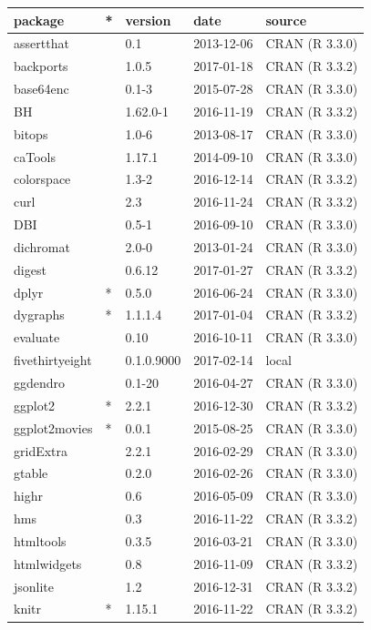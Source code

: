 \documentclass[]{tufte-book}
\theoremstyle{definition}
\theoremstyle{definition}
\theoremstyle{remark}
\begin{document}
\begin{longtable}{lllll}
\toprule
package & * & version & date & source\\
\midrule
assertthat &  & 0.1 & 2013-12-06 & CRAN (R 3.3.0)\\
backports &  & 1.0.5 & 2017-01-18 & CRAN (R 3.3.2)\\
base64enc &  & 0.1-3 & 2015-07-28 & CRAN (R 3.3.0)\\
BH &  & 1.62.0-1 & 2016-11-19 & CRAN (R 3.3.2)\\
bitops &  & 1.0-6 & 2013-08-17 & CRAN (R 3.3.0)\\
\addlinespace
caTools &  & 1.17.1 & 2014-09-10 & CRAN (R 3.3.0)\\
colorspace &  & 1.3-2 & 2016-12-14 & CRAN (R 3.3.2)\\
curl &  & 2.3 & 2016-11-24 & CRAN (R 3.3.2)\\
DBI &  & 0.5-1 & 2016-09-10 & CRAN (R 3.3.0)\\
dichromat &  & 2.0-0 & 2013-01-24 & CRAN (R 3.3.0)\\
\addlinespace
digest &  & 0.6.12 & 2017-01-27 & CRAN (R 3.3.2)\\
dplyr & * & 0.5.0 & 2016-06-24 & CRAN (R 3.3.0)\\
dygraphs & * & 1.1.1.4 & 2017-01-04 & CRAN (R 3.3.2)\\
evaluate &  & 0.10 & 2016-10-11 & CRAN (R 3.3.0)\\
fivethirtyeight &  & 0.1.0.9000 & 2017-02-14 & local\\
\addlinespace
ggdendro &  & 0.1-20 & 2016-04-27 & CRAN (R 3.3.0)\\
ggplot2 & * & 2.2.1 & 2016-12-30 & CRAN (R 3.3.2)\\
ggplot2movies & * & 0.0.1 & 2015-08-25 & CRAN (R 3.3.0)\\
gridExtra &  & 2.2.1 & 2016-02-29 & CRAN (R 3.3.0)\\
gtable &  & 0.2.0 & 2016-02-26 & CRAN (R 3.3.0)\\
\addlinespace
highr &  & 0.6 & 2016-05-09 & CRAN (R 3.3.0)\\
hms &  & 0.3 & 2016-11-22 & CRAN (R 3.3.2)\\
htmltools &  & 0.3.5 & 2016-03-21 & CRAN (R 3.3.0)\\
htmlwidgets &  & 0.8 & 2016-11-09 & CRAN (R 3.3.2)\\
jsonlite &  & 1.2 & 2016-12-31 & CRAN (R 3.3.2)\\
\addlinespace
knitr & * & 1.15.1 & 2016-11-22 & CRAN (R 3.3.2)\\

\end{longtable}
\end{document}
